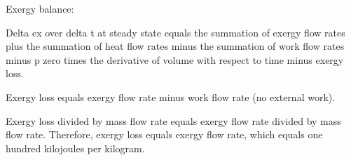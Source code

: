 Exergy balance:  

Delta ex over delta t at steady state equals the summation of exergy flow rates plus the summation of heat flow rates minus the summation of work flow rates minus p zero times the derivative of volume with respect to time minus exergy loss.  

Exergy loss equals exergy flow rate minus work flow rate (no external work).  

Exergy loss divided by mass flow rate equals exergy flow rate divided by mass flow rate. Therefore, exergy loss equals exergy flow rate, which equals one hundred kilojoules per kilogram.